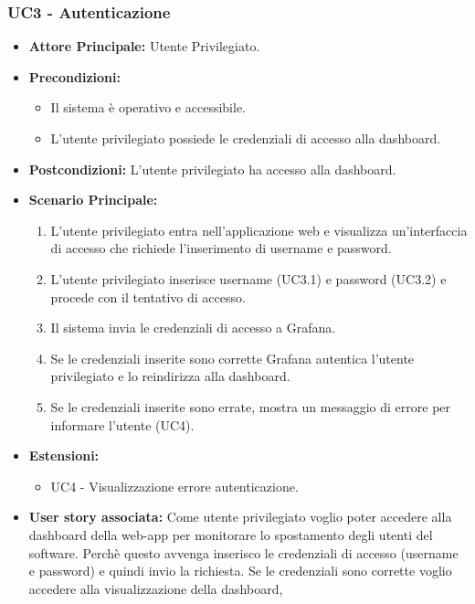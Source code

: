 \documentclass[11pt]{article}
\begin{document}
\begin{justify}
\subsubsection{\textbf{UC3 - Autenticazione}}
\begin{itemize}
     \item \textbf{Attore Principale:} Utente Privilegiato.
     \item \textbf{Precondizioni:}
        \begin{itemize}
            \item Il sistema è operativo e accessibile.
            \item L'utente privilegiato possiede le credenziali di accesso alla dashboard.
        \end{itemize}
     \item \textbf{Postcondizioni:} L'utente privilegiato ha accesso alla dashboard.
     \item \textbf{Scenario Principale:}
        \begin{enumerate}
            \item L'utente privilegiato entra nell'applicazione web e visualizza un'interfaccia di accesso che richiede l'inserimento di username e password.
            \item L'utente privilegiato inserisce username (UC3.1) e password (UC3.2) e procede con il tentativo di accesso.
            \item Il sistema invia le credenziali di accesso a Grafana.
            \item Se le credenziali inserite sono corrette Grafana autentica l’utente privilegiato e lo reindirizza alla dashboard.
            \item Se le credenziali inserite sono errate, mostra un messaggio di errore per informare l’utente (UC4).
        \end{enumerate}
     \item \textbf{Estensioni:}
        \begin{itemize}
            \item UC4 - Visualizzazione errore autenticazione.
        \end{itemize}
     \item \textbf{User story associata:}
     Come utente privilegiato voglio poter accedere alla dashboard della web-app per monitorare lo spostamento degli utenti del software. Perchè questo avvenga inserisco le credenziali di accesso (username e password) e quindi invio la richiesta. Se le credenziali sono corrette voglio accedere alla visualizzazione della dashboard, 

\end{itemize}
\end{justify}
\end{document}
